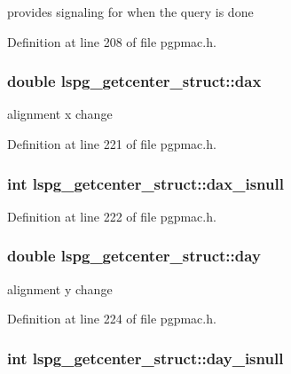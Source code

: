provides signaling for when the query is done 



Definition at line 208 of file pgpmac.\-h.

\hypertarget{structlspg__getcenter__struct_a17db52848c28852a470222ec93ae8886}{
\subsubsection[{dax}]{\setlength{\rightskip}{0pt plus 5cm}double lspg\-\_\-getcenter\-\_\-struct\-::dax}}\label{structlspg__getcenter__struct_a17db52848c28852a470222ec93ae8886}


alignment x change 



Definition at line 221 of file pgpmac.\-h.

\hypertarget{structlspg__getcenter__struct_a621b489777d61e9db8b33b784b8d70f9}{
\subsubsection[{dax\-\_\-isnull}]{\setlength{\rightskip}{0pt plus 5cm}int lspg\-\_\-getcenter\-\_\-struct\-::dax\-\_\-isnull}}\label{structlspg__getcenter__struct_a621b489777d61e9db8b33b784b8d70f9}


Definition at line 222 of file pgpmac.\-h.

\hypertarget{structlspg__getcenter__struct_a9ce0f29540f2ff47be9788565d19f1b8}{
\subsubsection[{day}]{\setlength{\rightskip}{0pt plus 5cm}double lspg\-\_\-getcenter\-\_\-struct\-::day}}\label{structlspg__getcenter__struct_a9ce0f29540f2ff47be9788565d19f1b8}


alignment y change 



Definition at line 224 of file pgpmac.\-h.

\hypertarget{structlspg__getcenter__struct_a36f57a319288810caf365cca7827ff96}{
\subsubsection[{day\-\_\-isnull}]{\setlength{\rightskip}{0pt plus 5cm}int lspg\-\_\-getcenter\-\_\-struct\-::day\-\_\-isnull}}\label{structlspg__getcenter__struct_a36f57a319288810caf365cca7827ff96}


